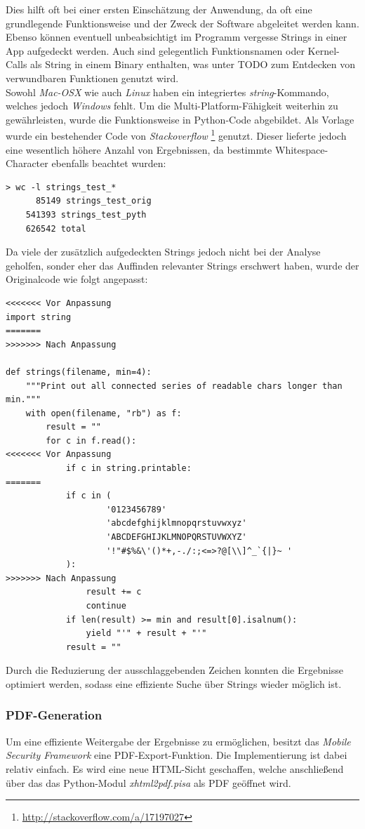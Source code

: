 Dies hilft oft bei einer ersten Einschätzung der Anwendung, da oft eine grundlegende Funktionsweise und der Zweck der Software abgeleitet werden kann. Ebenso können eventuell unbeabsichtigt im Programm vergesse Strings in einer App aufgedeckt werden. Auch sind gelegentlich Funktionsnamen oder Kernel-Calls als String in einem Binary enthalten, was unter TODO zum Entdecken von verwundbaren Funktionen genutzt wird.\\

Sowohl \textit{Mac-OSX} wie auch \textit{Linux} haben ein integriertes \textit{string}-Kommando, welches jedoch \textit{Windows} fehlt. Um die Multi-Platform-Fähigkeit weiterhin zu gewährleisten, wurde die Funktionsweise in Python-Code abgebildet. Als Vorlage wurde ein bestehender Code von \textit{Stackoverflow} \footnote{\url{http://stackoverflow.com/a/17197027}} genutzt. Dieser lieferte jedoch eine wesentlich höhere Anzahl von Ergebnissen, da bestimmte Whitespace-Character ebenfalls beachtet wurden:
\begin{lstlisting}
> wc -l strings_test_*
	  85149 strings_test_orig
  	541393 strings_test_pyth
    626542 total
\end{lstlisting}

Da viele der zusätzlich aufgedeckten Strings jedoch nicht bei der Analyse geholfen, sonder eher das Auffinden relevanter Strings erschwert haben, wurde der Originalcode wie folgt angepasst:
\begin{lstlisting}
<<<<<<< Vor Anpassung
import string
=======
>>>>>>> Nach Anpassung

def strings(filename, min=4):
    """Print out all connected series of readable chars longer than min."""
    with open(filename, "rb") as f:
        result = ""
        for c in f.read():
<<<<<<< Vor Anpassung
            if c in string.printable:
=======
            if c in (
                    '0123456789'
                    'abcdefghijklmnopqrstuvwxyz'
                    'ABCDEFGHIJKLMNOPQRSTUVWXYZ'
                    '!"#$%&\'()*+,-./:;<=>?@[\\]^_`{|}~ '
            ):
>>>>>>> Nach Anpassung
                result += c
                continue
            if len(result) >= min and result[0].isalnum():
                yield "'" + result + "'"
            result = ""
\end{lstlisting}
Durch die Reduzierung der ausschlaggebenden Zeichen konnten die Ergebnisse optimiert werden, sodass eine effiziente Suche über Strings wieder möglich ist.

\subsubsection{PDF-Generation}
Um eine effiziente Weitergabe der Ergebnisse zu ermöglichen, besitzt das \textit{Mobile Security Framework} eine PDF-Export-Funktion. Die Implementierung ist dabei relativ einfach. Es wird eine neue HTML-Sicht geschaffen, welche anschließend über das das Python-Modul \textit{xhtml2pdf.pisa} als PDF geöffnet wird.

